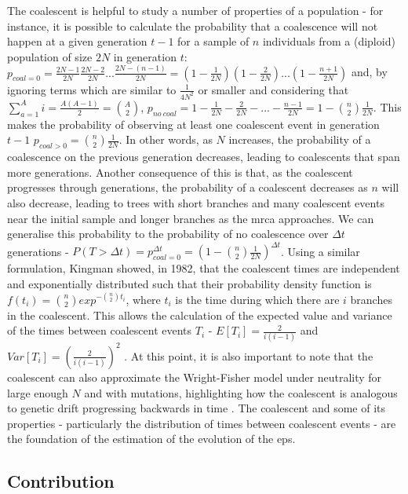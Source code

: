 The coalescent is helpful to study a number of properties of a population - for instance, it is possible to calculate the probability that a coalescence will not happen at a given generation $t-1$ for a sample of $n$ individuals from a (diploid) population of size $2N$ in generation $t$: $p_{coal=0} = \frac{2N-1}{2N}\frac{2N-2}{2N}...\frac{2N-(n-1)}{2N} = (1 - \frac{1}{2N})(1 - \frac{2}{2N})...(1 - \frac{n+1}{2N})$ and, by ignoring terms which are similar to $\frac{1}{4N^2}$ or smaller and considering that $\sum^A_{a=1}{i} = \frac{A(A-1)}{2} = \binom{A}{2}$, $p_{no\ coal} = 1 - \frac{1}{2N} - \frac{2}{2N} -...- \frac{n-1}{2N} = 1 - \binom{n}{2}\frac{1}{2N}$. This makes the probability of observing at least one coalescent event in generation $t-1$ $p_{coal>0} = \binom{n}{2}\frac{1}{2N}$. In other words, as $N$ increases, the probability of a coalescence on the previous generation decreases, leading to coalescents that span more generations. Another consequence of this is that, as the coalescent progresses through generations, the probability of a coalescent decreases as $n$ will also decrease, leading to trees with short branches and many coalescent events near the initial sample and longer branches as the \ac{mrca} approaches. We can generalise this probability to the probability of no coalescence over $\Delta t$ generations - $P(T > \Delta t) = p_{coal=0}^{\Delta t} = (1-\binom{n}{2}\frac{1}{2N})^{\Delta t}$. Using a similar formulation, Kingman showed, in 1982, that the coalescent times are independent and exponentially distributed such that their probability density function is $f(t_i) = \binom{n}{2}exp^{-\binom{n}{2}t_i}$, where $t_i$ is the time during which there are $i$ branches in the coalescent. This allows the calculation of the expected value and variance of the times between coalescent events $T_i$ - $E[T_i] = \frac{2}{i(i-1)}$ and $Var[T_i] = (\frac{2}{i(i-1)})^2$ \cite{Kingman1982-tc}. At this point, it is also important to note that the coalescent can also approximate the Wright-Fisher model under neutrality for large enough $N$ and with mutations, highlighting how the coalescent is analogous to genetic drift progressing backwards in time \cite{Wakeley2008-wh}. The coalescent and some of its properties - particularly the distribution of times between coalescent events - are the foundation of the estimation of the evolution of the \ac{eps}.

\subsection{Contribution}

